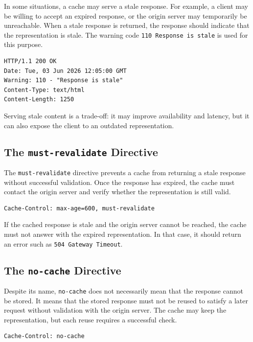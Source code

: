 \documentclass{scrbook}
\begin{document}
In some situations, a cache may serve a stale response. For example, a client may be willing to accept an expired response, or the origin server may temporarily be unreachable. When a stale response is returned, the response should indicate that the representation is stale. The warning code \texttt{110 Response is stale} is used for this purpose.

\begin{lstlisting}
HTTP/1.1 200 OK
Date: Tue, 03 Jun 2026 12:05:00 GMT
Warning: 110 - "Response is stale"
Content-Type: text/html
Content-Length: 1250
\end{lstlisting}

Serving stale content is a trade-off: it may improve availability and latency, but it can also expose the client to an outdated representation.

\subsection{The \texttt{must-revalidate} Directive}

The \texttt{must-revalidate} directive prevents a cache from returning a stale response without successful validation. Once the response has expired, the cache must contact the origin server and verify whether the representation is still valid.

\begin{lstlisting}
Cache-Control: max-age=600, must-revalidate
\end{lstlisting}

If the cached response is stale and the origin server cannot be reached, the cache must not answer with the expired representation. In that case, it should return an error such as \texttt{504 Gateway Timeout}.

\subsection{The \texttt{no-cache} Directive}

Despite its name, \texttt{no-cache} does not necessarily mean that the response cannot be stored. It means that the stored response must not be reused to satisfy a later request without validation with the origin server. The cache may keep the representation, but each reuse requires a successful check.

\begin{lstlisting}
Cache-Control: no-cache
\end{lstlisting}
\end{document}
